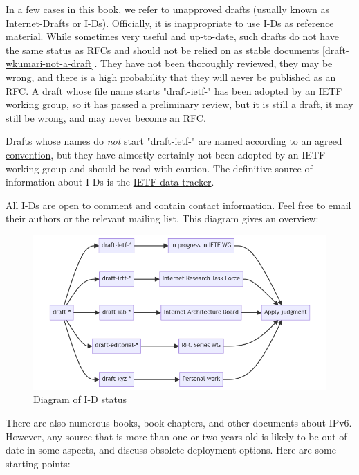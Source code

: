 \documentclass[
]{article}
\begin{document}
In a few cases in this book, we refer to unapproved drafts (usually
known as Internet-Drafts or I-Ds). Officially, it is inappropriate to
use I-Ds as reference material. While sometimes very useful and
up-to-date, such drafts do not have the same status as RFCs and should
not be relied on as stable documents
{[}\href{https://datatracker.ietf.org/doc/draft-wkumari-not-a-draft/}{draft-wkumari-not-a-draft}{]}.
They have not been thoroughly reviewed, they may be wrong, and there is
a high probability that they will never be published as an RFC. A draft
whose file name starts "draft-ietf-" has been adopted by an IETF working
group, so it has passed a preliminary review, but it is still a draft,
it may still be wrong, and may never become an RFC.

Drafts whose names do \emph{not} start "draft-ietf-" are named according
to an agreed
\href{https://authors.ietf.org/naming-your-internet-draft}{convention},
but they have almostly certainly not been adopted by an IETF working
group and should be read with caution. The definitive source of
information about I-Ds is the \href{https://datatracker.ietf.org/}{IETF
data tracker}.

All I-Ds are open to comment and contain contact information. Feel free
to email their authors or the relevant mailing list. This diagram gives
an overview:

\begin{figure}
\centering
\includegraphics{id-diagram.png}
\caption{Diagram of I-D status}
\end{figure}

There are also numerous books, book chapters, and other documents about
IPv6. However, any source that is more than one or two years old is
likely to be out of date in some aspects, and discuss obsolete
deployment options. Here are some starting points:
\end{document}
